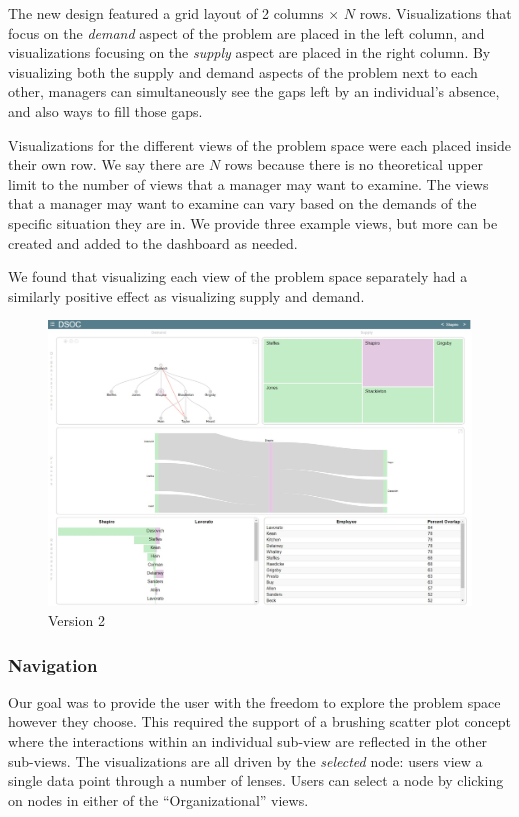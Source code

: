 \documentclass[journal]{vgtc}                %
\begin{document}
The new design featured a grid layout of 2 columns $\times $ $N$ rows. Visualizations that focus on the \emph{demand} aspect of the problem are placed in the left column, and visualizations focusing on the \emph{supply} aspect are placed in the right column. By visualizing both the supply and demand aspects of the problem next to each other, managers can simultaneously see the gaps left by an individual's absence, and also ways to fill those gaps.

Visualizations for the different views of the problem space were each placed inside their own row. We say there are $N$ rows because there is no theoretical upper limit to the number of views that a manager may want to examine. The views that a manager may want to examine can vary based on the demands of the specific situation they are in. We provide three example views, but more can be created and added to the dashboard as needed.

We found that visualizing each view of the problem space separately had a similarly positive effect as visualizing supply and demand. 

\begin{figure}
	\centering
	\includegraphics[width=\columnwidth]{pictures/version2.jpg}
	\caption{Version 2}
	\label{fig:version2}
\end{figure}

\subsubsection{Navigation}



Our goal was to provide the user with the freedom to explore the problem space however they choose.  This required the support of a brushing scatter plot concept where the interactions within an individual sub-view are reflected in the other sub-views. The visualizations are all driven by the \emph{selected} node: users view a single data point through a number of lenses. Users can select a node by clicking on nodes in either of the ``Organizational'' views. 
\end{document}
